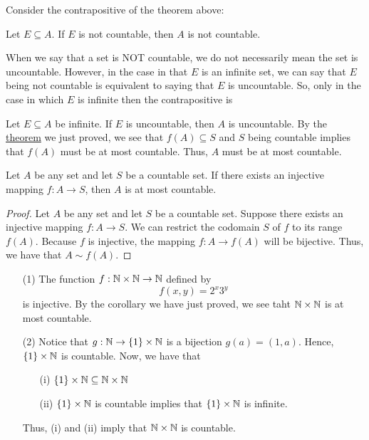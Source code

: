 \documentclass[a4paper]{report}
\begin{document}
\begin{remark}
   Consider the contrapositive of the theorem above:  
   \begin{center}
       Let \( E  \subseteq  A  \). If \( E  \) is not countable, then \( A  \) is not countable. 
   \end{center}
   When we say that a set is NOT countable, we do not necessarily mean the set is uncountable. However, in the case in that \( E  \) is an infinite set, we can say that \( E  \) being not countable is equivalent to saying that \( E  \) is uncountable. So, only in the case in which \( E  \) is infinite then the contrapositive is 
   \begin{center}
       Let \( E \subseteq A   \) be infinite. If \( E  \) is uncountable, then \( A  \) is uncountable. By the {\hyperref[Subsets of countable sets is countable]{theorem}} we just proved, we see that \( f(A) \subseteq S   \) and \( S  \) being countable implies that \( f(A) \) must be at most countable. Thus, \( A  \) must be at most countable.
   \end{center}
   
\end{remark}

\begin{corollary}[ ]\label{Injective mapping implies at most countability}
   Let \( A  \) be any set and let \( S  \) be a countable set. If there exists an injective mapping \( f: A \to S  \), then \( A  \) is at most countable. 
\end{corollary}
\begin{proof}
Let \( A  \) be any set and let \( S  \) be a countable set. Suppose there exists an injective mapping \( f: A \to S  \). We can restrict the codomain \( S  \) of \( f  \) to its range \( f(A) \). Because \( f  \) is injective, the mapping \( f: A \to f(A) \) will be bijective. Thus, we have that \( A \sim f(A) \).
\end{proof}

\begin{eg}
   \begin{enumerate}
       \item[(1)] The function \( f: \mathbb{N} \times \mathbb{N} \to \mathbb{N}  \) defined by
           \[  f(x,y) = 2^{x} 3^{y} \]
           is injective. By the corollary we have just proved, we see taht \( \mathbb{N} \times \mathbb{N}  \) is at most countable. 
        \item[(2)] Notice that \( g: \mathbb{N} \to \{ 1 \}  \times \mathbb{N}  \) is a bijection \( g(a) = (1,a) \). Hence, \( \{ 1 \}  \times \mathbb{N}  \) is countable. Now, we have that  
            \begin{enumerate}
                \item[(i)] \( \{ 1 \}  \times \mathbb{N} \subseteq  \mathbb{N} \times \mathbb{N}   \)  
                \item[(ii)] \( \{ 1 \} \times \mathbb{N}  \) is countable implies that \( \{ 1 \}  \times \mathbb{N}  \) is infinite.
            \end{enumerate}
            Thus, (i) and (ii) imply that \( \mathbb{N} \times \mathbb{N}  \) is countable.
   \end{enumerate} 
\end{eg}
\end{document}
